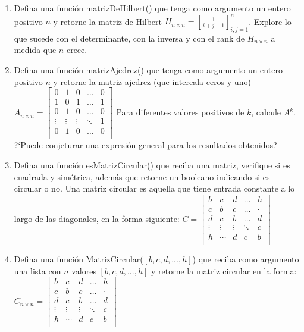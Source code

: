 \documentclass{article}
\begin{document}
\begin{enumerate}
\item Defina una funci\'on matrizDeHilbert() que tenga como argumento un entero positivo $n$ y retorne la matriz de Hilbert $H _{n\times n}=[\frac{1}{i+j+1}] _{i,j=1} ^{n}$. Explore lo que sucede con el determinante, con la inversa y con el rank de $H_{n\times n}$ a medida que $n$ crece.

\item Defina una funci\'on matrizAjedrez() que tenga como argumento un entero positivo $n$ y retorne la matriz ajedrez (que intercala ceros y uno) $A_{n\times n} = \begin{bmatrix}
0 &1 &0 &\dots &0\\
1 &0 &1 &\dots &1\\
0 &1 &0 &\dots &0\\
\vdots &\vdots &\vdots &\ddots &1\\
0 &1 &0 &\dots &0\\
\end{bmatrix}$
Para diferentes valores positivos de $k$, calcule $A ^k$.
?`Puede  conjeturar una expresi\'on general para los resultados obtenidos?

\item Defina una funci\'on esMatrizCircular() que reciba una matriz, verifique si es cuadrada y sim\'etrica, adem\'as que  retorne un booleano indicando si es circular o no. Una matriz circular es aquella que tiene entrada constante a lo largo de las diagonales, en la forma siguiente: $C = \begin{bmatrix}
b &c &d &\dots &h\\
c &b &c &\dots &\cdot\\
d &c &b &\dots &d\\
\vdots &\vdots &\vdots &\ddots &c\\
h &\cdots &d &c &b\\
\end{bmatrix}$

\item Defina una funci\'on MatrizCircular($[b,c,d,...,h]$) que reciba como argumento una lista con $n$ valores $[b,c,d,...,h]$ y retorne la matriz circular en la forma: $C _{n\times n} = \begin{bmatrix}
b &c &d &\dots &h\\
c &b &c &\dots &\cdot\\
d &c &b &\dots &d\\
\vdots &\vdots &\vdots &\ddots &c\\
h &\cdots &d &c &b\\
\end{bmatrix}$

\end{enumerate}
\end{document}
